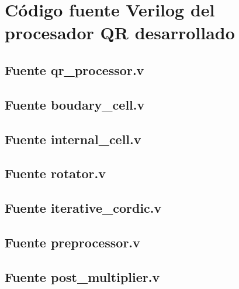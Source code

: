 \chapter{Código fuente Verilog del procesador QR desarrollado}
\label{cap:apA}

\section{Fuente qr\_processor.v}



\section{Fuente boudary\_cell.v}



\section{Fuente internal\_cell.v}



\section{Fuente rotator.v}



\section{Fuente iterative\_cordic.v}



\section{Fuente preprocessor.v}



\section{Fuente post\_multiplier.v}

